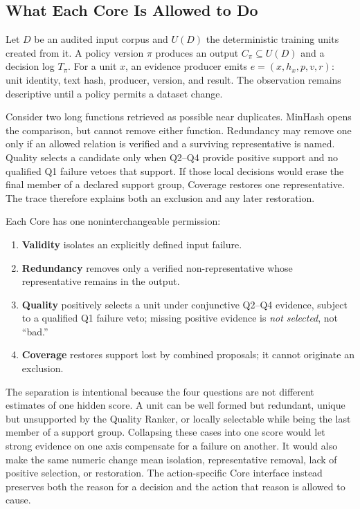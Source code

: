 \documentclass[conference]{IEEEtran}
\begin{document}
\subsection{What Each Core Is Allowed to Do}
Let $D$ be an audited input corpus and $U(D)$ the deterministic training units
created from it. A policy version $\pi$ produces an output
$C_\pi\subseteq U(D)$ and a decision log $T_\pi$. For a unit $x$, an evidence producer emits
$e=(x,h_x,p,v,r)$: unit identity, text hash, producer, version, and result. The
observation remains descriptive until a policy permits a dataset change.

Consider two long functions retrieved as possible near duplicates. MinHash
opens the comparison, but cannot remove either function. Redundancy may remove
one only if an allowed relation is verified and a surviving representative is
named. Quality selects a candidate only when Q2--Q4 provide positive support
and no qualified Q1 failure vetoes that support. If those local decisions would erase the final
member of a declared support group, Coverage restores one representative. The
trace therefore explains both an exclusion and any later restoration.

Each Core has one noninterchangeable permission:
\begin{enumerate}
  \item \textbf{Validity} isolates an explicitly defined input failure.
  \item \textbf{Redundancy} removes only a verified non-representative whose
  representative remains in the output.
  \item \textbf{Quality} positively selects a unit under conjunctive Q2--Q4
  evidence, subject to a qualified Q1 failure veto; missing positive evidence
  is \emph{not selected}, not ``bad.''
  \item \textbf{Coverage} restores support lost by combined proposals; it
  cannot originate an exclusion.
\end{enumerate}

The separation is intentional because the four questions are not different
estimates of one hidden score. A unit can be well formed but redundant, unique
but unsupported by the Quality Ranker, or locally selectable while being the
last member of a support group. Collapsing these cases into one score would let
strong evidence on one axis compensate for a failure on another. It would also
make the same numeric change mean isolation, representative removal, lack of
positive selection, or restoration. The action-specific Core interface instead preserves
both the reason for a decision and the action that reason is allowed to cause.
\end{document}
